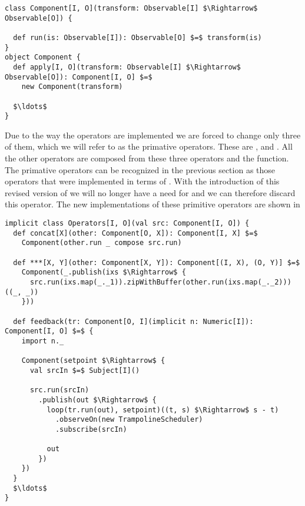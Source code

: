 \begin{minipage}{\linewidth}
\begin{lstlisting}[style=ScalaStyle, caption={Revised version of the \comp interface}, label={lst:component-v2}]
class Component[I, O](transform: Observable[I] $\Rightarrow$ Observable[O]) {

  def run(is: Observable[I]): Observable[O] $=$ transform(is)
}
object Component {
  def apply[I, O](transform: Observable[I] $\Rightarrow$ Observable[O]): Component[I, O] $=$
    new Component(transform)

  $\ldots$
}
\end{lstlisting}
\end{minipage}

Due to the way the operators are implemented we are forced to change only three of them, which we will refer to as the primative operators. These are , \code{(***)} and . All the other operators are composed from these three operators and the  function. The primative operators can be recognized in the previous section as those operators that were implemented in terms of . With the introduction of this revised version of \comp we will no longer have a need for  and we can therefore discard this operator.  The new implementations of these primitive operators are shown in 

\begin{minipage}{\linewidth}
\begin{lstlisting}[style=ScalaStyle, caption={Revised implementations of the primitive operators}, label={lst:primative-operator-revisions}]
implicit class Operators[I, O](val src: Component[I, O]) {
  def concat[X](other: Component[O, X]): Component[I, X] $=$
    Component(other.run _ compose src.run)
  
  def ***[X, Y](other: Component[X, Y]): Component[(I, X), (O, Y)] $=$
    Component(_.publish(ixs $\Rightarrow$ {
      src.run(ixs.map(_._1)).zipWithBuffer(other.run(ixs.map(_._2)))((_, _))
    }))
  
  def feedback(tr: Component[O, I](implicit n: Numeric[I]): Component[I, O] $=$ {
    import n._
    
    Component(setpoint $\Rightarrow$ {
      val srcIn $=$ Subject[I]()
      
      src.run(srcIn)
        .publish(out $\Rightarrow$ {
          loop(tr.run(out), setpoint)((t, s) $\Rightarrow$ s - t)
            .observeOn(new TrampolineScheduler)
            .subscribe(srcIn)

          out
        })
    })
  }
  $\ldots$
}
\end{lstlisting}
\end{minipage}

